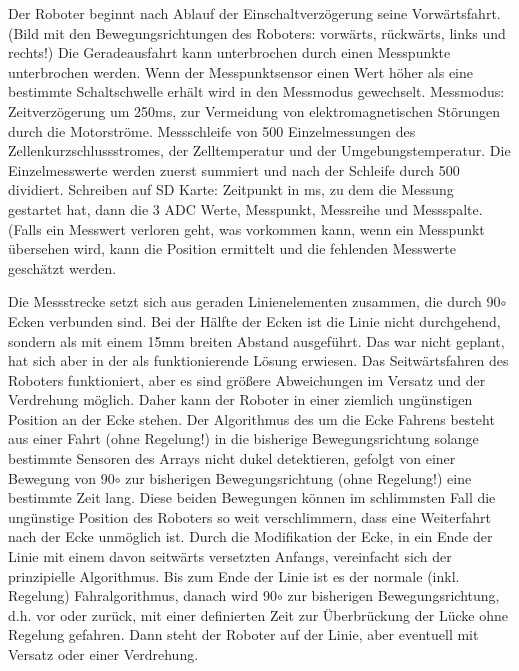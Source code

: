 \documentclass[a4paper,bibtotoc,oneside]{scrbook}
\begin{document}
Der Roboter beginnt nach Ablauf der Einschaltverzögerung seine Vorwärtsfahrt. (Bild mit den Bewegungsrichtungen des Roboters: vorwärts, rückwärts, links und rechts!)
Die Geradeausfahrt kann unterbrochen durch einen Messpunkte unterbrochen werden. Wenn der Messpunktsensor einen Wert höher als eine bestimmte Schaltschwelle erhält wird in den Messmodus gewechselt.
Messmodus: Zeitverzögerung um 250ms, zur Vermeidung von elektromagnetischen Störungen durch die Motorströme. Messschleife von 500 Einzelmessungen des Zellenkurzschlussstromes, der Zelltemperatur und der Umgebungstemperatur. Die Einzelmesswerte werden zuerst summiert und nach der Schleife durch 500 dividiert. 
Schreiben auf SD Karte: Zeitpunkt in ms, zu dem die Messung gestartet hat, dann die 3 ADC Werte, Messpunkt, Messreihe und Messspalte. (Falls ein Messwert verloren geht, was vorkommen kann, wenn ein Messpunkt übersehen wird, kann die Position ermittelt und die fehlenden Messwerte geschätzt werden.

Die Messstrecke setzt sich aus geraden Linienelementen zusammen, die durch 90$\circ$ Ecken verbunden sind. Bei der Hälfte der Ecken ist die Linie nicht durchgehend, sondern als mit einem 15mm breiten Abstand ausgeführt. Das war nicht geplant, hat sich aber in der als funktionierende Lösung erwiesen. Das Seitwärtsfahren des Roboters funktioniert, aber es sind größere Abweichungen im Versatz und der Verdrehung möglich. Daher kann der Roboter in einer ziemlich ungünstigen Position an der Ecke stehen. Der Algorithmus des um die Ecke Fahrens besteht aus einer Fahrt (ohne Regelung!) in die bisherige Bewegungsrichtung solange bestimmte Sensoren des Arrays nicht dukel detektieren, gefolgt von einer Bewegung von 90$\circ$ zur bisherigen Bewegungsrichtung (ohne Regelung!) eine bestimmte Zeit lang. Diese beiden Bewegungen können im schlimmsten Fall die ungünstige Position des Roboters so weit verschlimmern, dass eine Weiterfahrt nach der Ecke unmöglich ist.
Durch die Modifikation der Ecke, in ein Ende der Linie mit einem davon seitwärts versetzten Anfangs, vereinfacht sich der prinzipielle Algorithmus. Bis zum Ende der Linie ist es der normale (inkl. Regelung) Fahralgorithmus, danach wird 90$\circ$ zur bisherigen Bewegungsrichtung, d.h. vor oder zurück, mit einer definierten Zeit zur Überbrückung der Lücke ohne Regelung gefahren. Dann steht der Roboter auf der Linie, aber eventuell mit Versatz oder einer Verdrehung.
\end{document}
